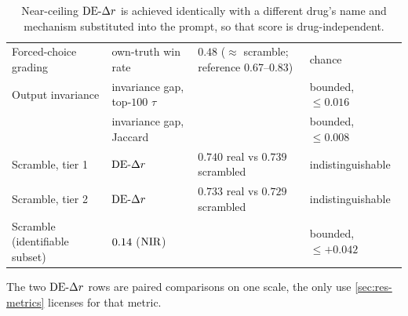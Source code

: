 \begin{table}[htbp]
\caption{ Near-ceiling $\DEdr$ is achieved identically with a different drug's name and mechanism substituted into the prompt, so that score is drug-independent.}
\label{tab:blind}
\begin{fullwidth}
\begin{threeparttable}
\begin{tabularx}{\linewidth}{@{}l l l Y@{}}
 &  &  &  \\
\midrule
Forced-choice grading & own-truth win rate
  & $0.48$ ($\approx$ scramble; reference 0.67--0.83) & chance \\
\addlinespace[10pt]
Output invariance & invariance gap, top-$100$ $\tau$ & 
  & bounded, $\leq 0.016$ \\
 & invariance gap, Jaccard & 
  & bounded, $\leq 0.008$ \\
\addlinespace[10pt]
Scramble, tier 1 & $\DEdr$ & $0.740$ real vs $0.739$ scrambled
  & indistinguishable \\
Scramble, tier 2 & $\DEdr$ & $0.733$ real vs $0.729$ scrambled
  & indistinguishable \\
Scramble (identifiable subset) & $0.14$ ($\textrm{NIR}$) & 
  & bounded, $\leq +0.042$ \\
\end{tabularx}
\begin{tablenotes}[flushleft]
\item The two $\DEdr$ rows are paired comparisons on one scale, the only use
\cref{sec:res-metrics} licenses for that metric.
\end{tablenotes}
\end{threeparttable}
\end{fullwidth}
\end{table}

